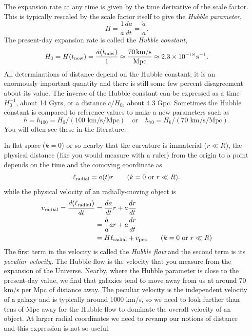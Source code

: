 The expansion rate at any time is given by the time derivative of the scale factor.  This is typically rescaled by the scale factor itself to give the \textit{Hubble parameter},
\begin{equation}
  H = \frac{1}{a} \frac{da}{dt} = \frac{\dot a}{a}. 
\end{equation}
The present-day expansion rate is called the \textit{Hubble constant},
\begin{equation}
  H_0 = H(t_{\rm now}) = \frac{\dot a(t_{\rm now})}{1} \approx \frac{70\,\mbox{km/s}}{\mbox{Mpc}} \approx 2.3\times 10^{-18}\,\mbox{s}^{-1}.
\end{equation}
All determinations of distance depend on the Hubble constant; it is an enormously important quantity and there is still some few percent disagreement about its value.  The inverse of the Hubble constant can be expressed as a time $H_0^{-1}$, about 14 Gyrs, or a distance $c/H_0$, about 4.3 Gpc.  Sometimes the Hubble constant is compared to reference values to make a new parameters such as
\begin{equation}
  h = h_{100} = H_0 /(\mbox{100 km/s/Mpc}) \quad\mbox{or}\quad h_{70} = H_0 /(\mbox{70 km/s/Mpc}).%
\end{equation}
You will often see these in the literature.

In flat space ($k=0$) or so nearby that the curvature is immaterial ($r \ll R$), the physical distance (like you would measure with a ruler) from the origin to a point depends on the time and the comoving coordinate as
\begin{equation}   
  \ell_{\rm radial} = a(t) r  \qquad(k=0 \mbox{ or } r \ll R).
\end{equation}
while the physical velocity of an radially-moving object is
\begin{align}
  v_{\rm radial} = \frac{d(\ell_{\rm radial})}{dt} &= \frac{da}{dt} r + a \frac{dr}{dt} \\ \nonumber
  &= \frac{\dot a}{a} a r + a \frac{dr}{dt} \\ \nonumber
  &= H \ell_{\rm radial} + v_{\rm pec}   \qquad(k=0 \mbox{ or } r \ll R)  \label{eqn:vpec_flat}
\end{align}
The first term in the velocity is called the \textit{Hubble flow} and the second term is its \textit{peculiar velocity}.  The Hubble flow is the velocity that you measure from the expansion of the Universe.  Nearby, where the Hubble parameter is close to the present-day value, we find that galaxies tend to move away from us at around 70 km/s per Mpc of distance away.  The peculiar velocity is the independent velocity of a galaxy and is typically around 1000 km/s, so we need to look further than tens of Mpc away for the Hubble flow to dominate the overall velocity of an object.  At larger radial coordinates we need to revamp our notions of distance and this expression is not so useful.

